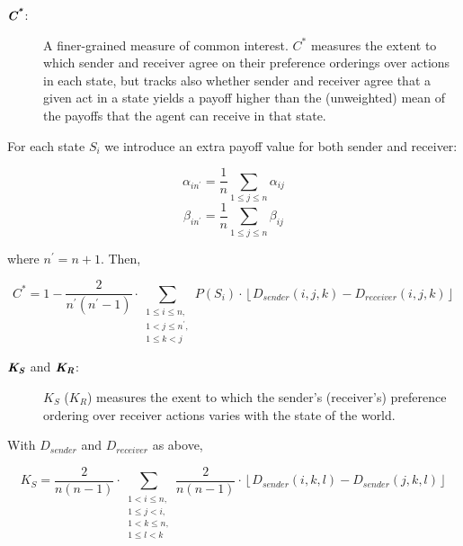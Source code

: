 \documentclass{article}
\def\mathbi#1{\textbf{\em #1}} %
\begin{document}
\begin{description}
    \item[$\mathbi{C}^\mathbi{*}$:]
A finer-grained measure of common interest. $C^*$
measures the extent to which sender and receiver agree on their
preference orderings over actions in each state, but tracks also whether
sender and receiver agree that a given act in a state yields a payoff
higher than the (unweighted) mean of the payoffs that the agent can
receive in that state.
\end{description}

For each state $S_{i}$ we introduce an extra payoff value for both
sender and receiver:

\[\alpha_{in^\prime} = \frac{1}{n}\sum\limits_{1 \leq j \leq n} \alpha_{ij}\]
\[\beta_{in^\prime} = \frac{1}{n}\sum\limits_{1 \leq j \leq n} \beta_{ij}\]

where $n^\prime = n + 1$. Then,

\[C^* = 1 - \frac{2}{n^\prime(n^\prime-1)}\cdot \sum\limits_{\substack{1 \leq i \leq n, \\ 1 < j \leq n^\prime, \\ 1 \leq k < j}} P\left(S_{i}\right)\cdot\left\lfloor D_{sender}(i, j, k) - D_{receiver}(i,j,k)\right\rfloor\]

\begin{description}
    \item[$\mathbi{K}_\mathbi{S}$ and $\mathbi{K}_\mathbi{R}$:]
$K_S$ ($K_R$) measures the exent to
which the sender's (receiver's) preference ordering over receiver actions 
varies with the state of the world.
\end{description}

With $D_{sender}$ and $D_{receiver}$ as above,

\[K_{S} = \frac{2}{n(n-1)}\cdot \sum\limits_{\substack{1 < i \leq n, \\ 1 \leq j < i, \\ 1 < k \leq n, \\ 1 \leq l < k}} \frac{2}{n(n-1)}\cdot\left\lfloor D_{sender}(i, k, l) - D_{sender}(j,k,l)\right\rfloor\]
\end{document}
